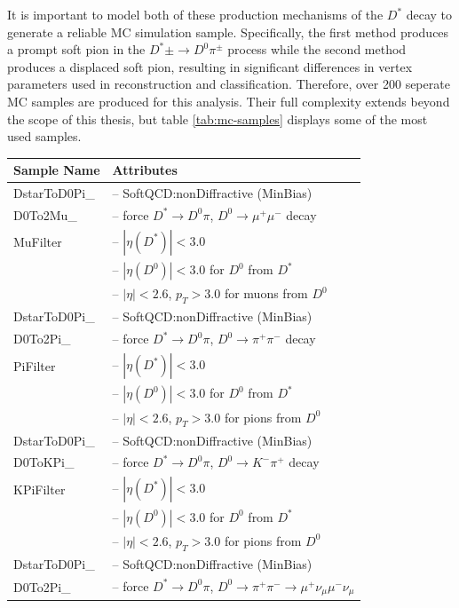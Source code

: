It is important to model both of these production mechanisms of the $D^*$ decay to generate a reliable MC simulation sample. Specifically, the first method produces a prompt soft pion in the $D^*\pm \to D^0 \pi^\pm$ process while the second method produces a displaced soft pion, resulting in significant differences in vertex parameters used in reconstruction and classification. Therefore, over 200 seperate MC samples are produced for this analysis. Their full complexity extends beyond the scope of this thesis, but table \ref{tab:mc-samples} displays some of the most used samples.

\begin{table}
\centering
\begin{tabular}{|p{3.2cm}|p{12cm}|}
    \hline
    \textbf{Sample Name} & \textbf{Attributes} \\
    \hline
    DstarToD0Pi\_ & -- SoftQCD:nonDiffractive (MinBias) \\
    D0To2Mu\_ & -- force $D^* \to D^0\pi$, $D^0 \to \mu^+\mu^-$ decay \\
    MuFilter & -- $|\eta(D^*)| < 3.0$ \\
    & -- $|\eta(D^0)| < 3.0$ for $D^0$ from $D^*$ \\
    & -- $|\eta| < 2.6$, $p_T > 3.0$ for muons from $D^0$ \\
    \hline
    DstarToD0Pi\_ & -- SoftQCD:nonDiffractive (MinBias) \\
    D0To2Pi\_ & -- force $D^* \to D^0\pi$, $D^0 \to \pi^+\pi^-$ decay \\
    PiFilter & -- $|\eta(D^*)| < 3.0$ \\
    & -- $|\eta(D^0)| < 3.0$ for $D^0$ from $D^*$ \\
    & -- $|\eta| < 2.6$, $p_T > 3.0$ for pions from $D^0$ \\
    \hline
    DstarToD0Pi\_ & -- SoftQCD:nonDiffractive (MinBias) \\
    D0ToKPi\_ & -- force $D^* \to D^0\pi$, $D^0 \to K^-\pi^+$ decay \\
    KPiFilter & -- $|\eta(D^*)| < 3.0$ \\
    & -- $|\eta(D^0)| < 3.0$ for $D^0$ from $D^*$ \\
    & -- $|\eta| < 2.6$, $p_T > 3.0$ for pions from $D^0$ \\
    \hline
    DstarToD0Pi\_ & -- SoftQCD:nonDiffractive (MinBias) \\
    D0To2Pi\_ & -- force $D^* \to D^0\pi$, $D^0 \to \pi^+\pi^- \to \mu^+\nu_\mu\mu^-\nu_\mu$ \\

\end{tabular}
\end{table}
